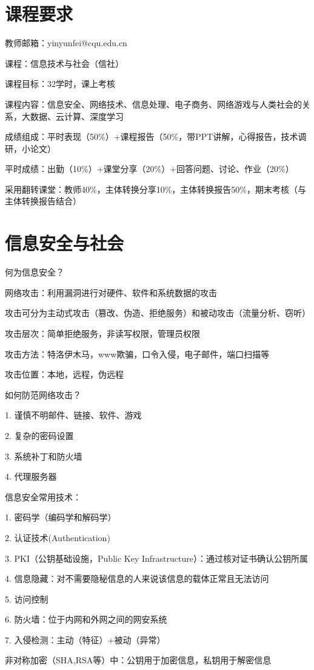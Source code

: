 \section*{课程要求}%
\label{sec:课程要求}
教师邮箱：yinyunfei@cqu.edu.cn

课程：信息技术与社会（信社）

课程目标：32学时，课上考核

课程内容：信息安全、网络技术、信息处理、电子商务、网络游戏与人类社会的关系，大数据、云计算、深度学习

成绩组成：平时表现（50\%）+课程报告（50\%，带PPT讲解，心得报告，技术调研，小论文）

平时成绩：出勤（10\%）+课堂分享（20\%）+回答问题、讨论、作业（20\%）

采用翻转课堂：教师40\%，主体转换分享10\%，主体转换报告50\%，期末考核（与主体转换报告结合）
\section{信息安全与社会}%
\label{sec:信息安全与社会}
\begin{question}
    何为信息安全？
\end{question}
\begin{notation}
    网络攻击：利用漏洞进行对硬件、软件和系统数据的攻击
\end{notation}
攻击可分为主动式攻击（篡改、伪造、拒绝服务）和被动攻击（流量分析、窃听）

攻击层次：简单拒绝服务，非读写权限，管理员权限

攻击方法：特洛伊木马，www欺骗，口令入侵，电子邮件，端口扫描等

攻击位置：本地，远程，伪远程
\begin{question}
    如何防范网络攻击？
\end{question}
1. 谨慎不明邮件、链接、软件、游戏

2. 复杂的密码设置

3. 系统补丁和防火墙

4. 代理服务器
\begin{notation}
    信息安全常用技术：

    1. 密码学（编码学和解码学）

    2. 认证技术(Authentication)

    3. PKI（公钥基础设施，Public Key Infrastructure）：通过核对证书确认公钥所属

    4. 信息隐藏：对不需要隐秘信息的人来说该信息的载体正常且无法访问

    5. 访问控制

    6. 防火墙：位于内网和外网之间的网安系统

    7. 入侵检测：主动（特征）+被动（异常）
\end{notation}
\begin{notation}
    非对称加密（SHA,RSA等）中：公钥用于加密信息，私钥用于解密信息
\end{notation}
